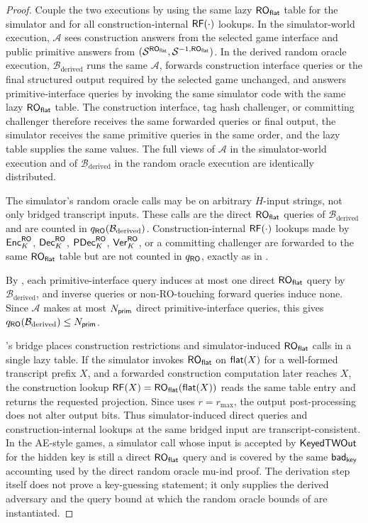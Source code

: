 \begin{proof}
Couple the two executions by using the same lazy $\mathsf{RO}_{\mathsf{flat}}$ table for
the simulator and for all construction-internal $\mathsf{RF}(\cdot)$ lookups.
In the simulator-world execution, $\mathcal{A}$ sees construction
answers from the selected game interface and public primitive answers
from $(\mathcal{S}^{\mathsf{RO}_{\mathsf{flat}}}, \mathcal{S}^{-1,\mathsf{RO}_{\mathsf{flat}}})$. In the derived
random oracle execution, $\mathcal{B}_{\mathrm{derived}}$ runs the
same $\mathcal{A}$, forwards construction interface queries or the final
structured output required by the selected game unchanged, and answers
primitive-interface queries by invoking the same simulator code with the same
lazy $\mathsf{RO}_{\mathsf{flat}}$ table. The construction interface, tag hash challenger, or
committing challenger therefore receives the same forwarded queries or final
output, the simulator receives the same primitive queries in the same order, and
the lazy table supplies the same values.
The full views of $\mathcal{A}$ in the simulator-world execution and of
$\mathcal{B}_{\mathrm{derived}}$ in the random oracle execution are identically
distributed.

The simulator's random oracle calls may be on arbitrary
\cite{BDPV08} $H$-input strings, not only bridged \TW{} transcript
inputs. These calls are the direct $\mathsf{RO}_{\mathsf{flat}}$ queries of
$\mathcal{B}_{\mathrm{derived}}$ and are counted in
$q_{\mathsf{RO}}(\mathcal{B}_{\mathrm{derived}})$. Construction-internal
$\mathsf{RF}(\cdot)$ lookups made by $\mathsf{Enc}_K^{\mathsf{RO}}$, $\mathsf{Dec}_K^{\mathsf{RO}}$,
$\mathsf{PDec}_K^{\mathsf{RO}}$, $\mathsf{Ver}_K^{\mathsf{RO}}$, or a committing challenger are forwarded to the
same $\mathsf{RO}_{\mathsf{flat}}$ table but are not counted in $q_{\mathsf{RO}}$, exactly as in
.

By , each primitive-interface query
induces at most one direct $\mathsf{RO}_{\mathsf{flat}}$ query by
$\mathcal{B}_{\mathrm{derived}}$, and inverse queries or
non-RO-touching forward queries induce none. Since $\mathcal{A}$ makes
at most $N_{\mathsf{prim}}$ direct primitive-interface queries, this gives
$q_{\mathsf{RO}}(\mathcal{B}_{\mathrm{derived}}) \leq N_{\mathsf{prim}}$.

's bridge places \TW{} construction
restrictions and simulator-induced $\mathsf{RO}_{\mathsf{flat}}$ calls in a single lazy
table. If the simulator invokes $\mathsf{RO}_{\mathsf{flat}}$ on $\mathsf{flat}(X)$ for a
well-formed \TW{} transcript prefix $X$, and a forwarded construction
computation later reaches $X$, the construction lookup
$\mathsf{RF}(X)=\mathsf{RO}_{\mathsf{flat}}(\mathsf{flat}(X))$ reads the same table entry and returns the
requested projection. Since \TW{} uses $r = r_{\max}$, the
\cite[Theorem~3]{BDPV11} output post-processing does not alter \TW{}
output bits. Thus simulator-induced direct queries and
construction-internal lookups at the same bridged input are
transcript-consistent. In the AE-style games, a simulator call whose input is
accepted by $\mathsf{KeyedTWOut}$ for the hidden key is still a direct
$\mathsf{RO}_{\mathsf{flat}}$ query and is covered by the same
$\mathsf{bad}_{\mathsf{key}}$ accounting used by the direct random oracle mu-ind proof. The
derivation step itself does not
prove a key-guessing statement; it only supplies the derived
adversary and the query bound at which the random oracle bounds of
 are instantiated.


\end{proof}
